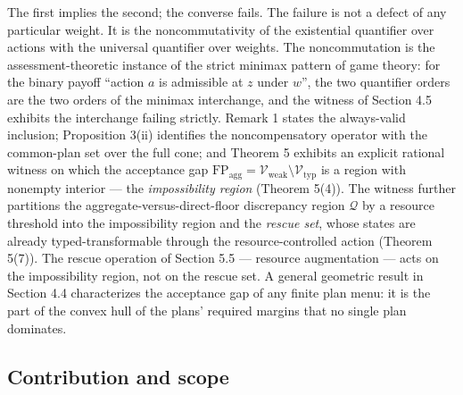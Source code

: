 \documentclass[review,11pt]{elsarticle}
\begin{document}
The first implies the second; the converse fails. The failure is not a
defect of any particular weight. It is the noncommutativity of the
existential quantifier over actions with the universal quantifier over
weights. The noncommutation is the assessment-theoretic instance of the
strict minimax pattern of game theory: for the binary payoff ``action
\(a\) is admissible at \(z\) under \(w\)'', the two quantifier orders
are the two orders of the minimax interchange, and the witness of
Section 4.5 exhibits the interchange failing strictly. Remark 1 states the always-valid inclusion; Proposition 3(ii) identifies the noncompensatory operator with the common-plan set over the full cone; and Theorem 5 exhibits an explicit rational witness on which the acceptance gap
\(\mathrm{FP}_{\mathrm{agg}} = \mathcal{V}_{\mathrm{weak}} \setminus \mathcal{V}_{\mathrm{typ}}\)
is a region with nonempty interior --- the \emph{impossibility region}
(Theorem 5(4)). The witness further partitions the
aggregate-versus-direct-floor discrepancy region \(\mathcal{Q}\) by a
resource threshold into the impossibility region and the \emph{rescue
set}, whose states are already typed-transformable through the
resource-controlled action (Theorem 5(7)). The rescue operation of
Section 5.5 --- resource augmentation --- acts on the impossibility
region, not on the rescue set. A general geometric result in Section 4.4
characterizes the acceptance gap of any finite plan menu: it is the part
of the convex hull of the plans' required margins that no single plan
dominates.

\subsection{Contribution and scope}\label{contribution-and-scope}
\end{document}
